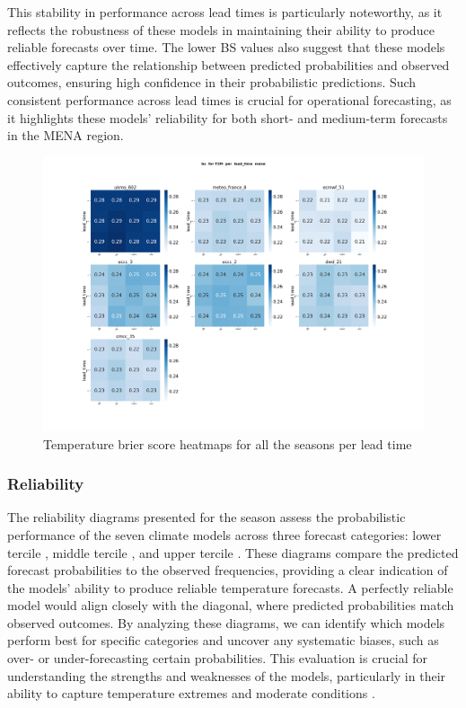 This stability in performance across lead times is particularly noteworthy, as it reflects the robustness of these models in maintaining their ability to produce reliable forecasts over time. The lower BS values also suggest that these models effectively capture the relationship between predicted probabilities and observed outcomes, ensuring high confidence in their probabilistic predictions. Such consistent performance across lead times is crucial for operational forecasting, as it highlights these models' reliability for both short- and medium-term forecasts in the MENA region.

\begin{figure}[H]
    \centering
    \includegraphics[width=1\linewidth]{plots/prob/bs/bs_T2M_lead_time_mena.png}
    \caption{Temperature brier score heatmaps for all the seasons per lead time}
    \label{fig:CORR_djf_t2m}
\end{figure}

\subsubsection{Reliability}
The reliability diagrams presented for the season assess the probabilistic performance of the seven climate models across three forecast categories: lower tercile , middle tercile , and upper tercile . These diagrams compare the predicted forecast probabilities to the observed frequencies, providing a clear indication of the models' ability to produce reliable temperature forecasts. A perfectly reliable model would align closely with the diagonal, where predicted probabilities match observed outcomes. By analyzing these diagrams, we can identify which models perform best for specific categories and uncover any systematic biases, such as over- or under-forecasting certain probabilities. This evaluation is crucial for understanding the strengths and weaknesses of the models, particularly in their ability to capture temperature extremes and moderate conditions .


